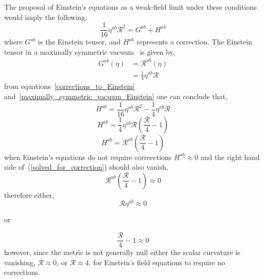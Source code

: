 \documentclass[aps,prd,preprint]{revtex4-1}
\begin{document}
The proposal of Einstein's equations as a weak-field limit under these conditions would imply the following,
\begin{equation}\label{corrections_to_Einstein}
    \frac{1}{16} \eta^{ab} \mathcal{R}^2 = G^{ab} + H^{ab}
\end{equation}
where $G^{ab}$ is the Einstein tensor, and $H^{ab}$ represents a correction. The Einstein tensor in a maximally symmetric vacuum~\cite{wheeler_1986} is given by,
\begin{equation}\label{maximally_symmetric_vacuum_Einstein}
\begin{aligned}
    G^{ab}(\eta) &= \mathcal{R}^{ab}(\eta) \\
    &= \frac{1}{4}\eta^{ab}\mathcal{R}
\end{aligned}
\end{equation}
from equations~\ref{corrections_to_Einstein} and~\ref{maximally_symmetric_vacuum_Einstein} one can conclude that,
\begin{equation*}
    H^{ab} = \frac{1}{16} \eta^{ab} \mathcal{R}^2 - \frac{1}{4}\eta^{ab}\mathcal{R}
\end{equation*}
\begin{equation*}
    H^{ab} = \frac{1}{4} \eta^{ab} \mathcal{R} \left( \frac{\mathcal{R}}{4} - 1 \right)
\end{equation*}
\begin{equation}\label{solved_for_correction}
    H^{ab} = \mathcal{R}^{ab} \left( \frac{\mathcal{R}}{4} - 1 \right)
\end{equation}
when Einstein's equations do not require correections $H^{ab} \approx 0$ and the right hand side of~(\ref{solved_for_correction}) should also vanish,
\begin{equation}
    \mathcal{R}^{ab} \left( \frac{\mathcal{R}}{4} - 1 \right) \approx 0
\end{equation}
therefore either,
\begin{equation*}
    \mathcal{R}\eta^{ab} \approx 0
\end{equation*}
\begin{center}
    or
\end{center}
\begin{equation*}
    \frac{\mathcal{R}}{4} - 1 \approx 0
\end{equation*}
however, since the metric is not generally null either the scalar curvature is vanishing, $\mathcal{R} \approx 0$, or $\mathcal{R} \approx 4$, for Einstein's field equations to require no corrections.
\end{document}
